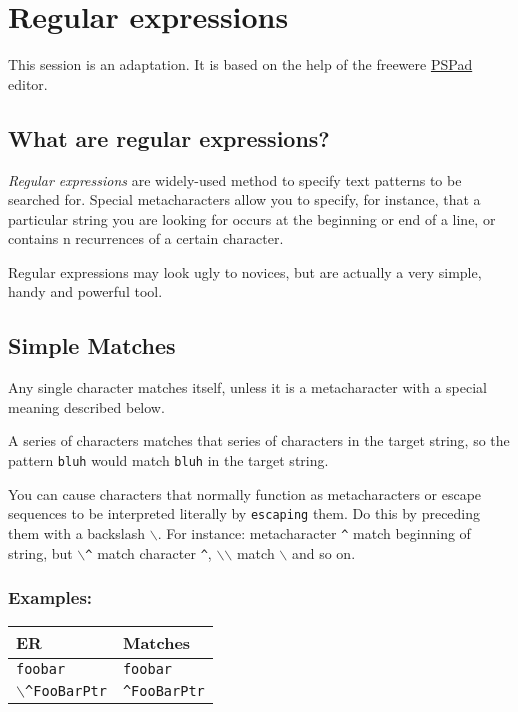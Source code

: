 
\hypertarget{working_regularexpressions}{}
\section{Regular expressions}

This session is an adaptation. It is based on the help of the
freewere \href{http://www.pspad.com/}{PSPad} editor.


\subsection{What are regular expressions?}

\textit{Regular expressions} are widely-used method to specify text patterns
to be searched for. Special metacharacters allow you to specify, for
instance, that a particular string you are looking for occurs at the
beginning or end of a line, or contains n recurrences of a certain character.

Regular expressions may look ugly to novices, but are actually a very simple,
handy and powerful tool.


\subsection{Simple Matches}

Any single character matches itself, unless it is a metacharacter with a
special meaning described below.

A series of characters matches that series of characters in the target
string, so the pattern \texttt{bluh} would match \texttt{bluh} in the
target string.

You can cause characters that normally function as metacharacters or
escape sequences to be interpreted literally by \texttt{escaping} them.
Do this by preceding them with a backslash \texttt{$\backslash$}. For
instance: metacharacter \texttt{\^{}} match beginning of string, but
\texttt{$\backslash$\^{}} match character \texttt{\^{}},
\texttt{$\backslash$$\backslash$} match \texttt{$\backslash$} and so on.


\subsubsection{Examples:}

\begin{footnotesize}
  \begin{tabularx}{\textwidth}{>{\hsize=0.3\hsize}X>{\hsize=0.7\hsize}X}\\
    \hline
    \textbf{ER} & \textbf{Matches} \\
    \hline
    \texttt{foobar} & \texttt{foobar} \\
    \texttt{$\backslash$\^{}FooBarPtr} & \texttt{\^{}FooBarPtr} \\
    \hline
  \end{tabularx}
\end{footnotesize}


